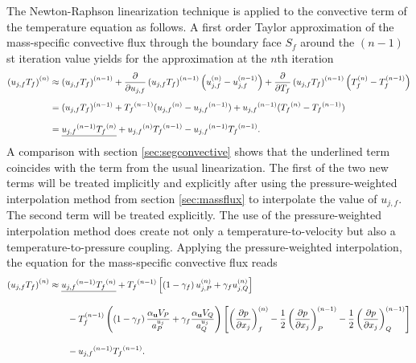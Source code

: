 The Newton-Raphson linearization technique is applied to the convective term of the temperature equation as follows. A first order Taylor approximation of the mass-specific convective flux through the boundary face \(S_f\) around the \((n-1)\)st iteration value yields for the approximation at the \(n\)th iteration
\begin{align*}
  \left(u_{j,f} T_f \right)^{(n)} 
  &\approx 
  \left(u_{j,f} T_f \right)^{(n-1)} 
  + \frac{\partial}{\partial u_{j,f}}\left( u_{j,f} T_f \right)^{(n-1)} \left(u_{j,f}^{(n)} - u_{j,f}^{(n-1)} \right) 
  + \frac{\partial}{\partial T_f}\left( u_{j,f} T_f \right)^{(n-1)} \left( T_f^{(n)} - T_f^{(n-1)} \right) \\[0.5em]
  &=
  (u_{j,f} T_f )^{(n-1)} 
  + \vphantom{(u_{j,f} T_f)}{T_f}^{(n-1)} (\vphantom{(u_{j,f} T_f)}{u_{j,f}}^{(n)} - \vphantom{(u_{j,f} T_f)}{u_{j,f}}^{(n-1)} ) 
  +  \vphantom{(u_j T)}{u_{j,f}}^{(n-1)} ( \vphantom{(u_j T)}{T_f}^{(n)} - \vphantom{(u_j T)}{T_f}^{(n-1)} ) \\[0.7em]
  &=
  \underline{\vphantom{(u_j T)}{u_{j,f}}^{(n-1)} \vphantom{(u_{j,f})}{T_f}^{(n)}}  + \vphantom{(u_{j,f} T_f)}{u_{j,f}}^{(n)} \vphantom{(u_jT)}{T_f}^{(n-1)}  -  \vphantom{(u_j T)}{u_{j,f}}^{(n-1)} \vphantom{(u_j T)}{T_f}^{(n-1)}.
\end{align*}
A comparison with section \ref{sec:segconvective} shows that the underlined term coincides with the term from the usual linearization. The first of the two new terms will be treated implicitly and explicitly after using the pressure-weighted interpolation method from section \ref{sec:massflux} to interpolate the value of \(u_{j,f}\). The second term will be treated explicitly. The use of the pressure-weighted interpolation method does create not only a temperature-to-velocity but also a temperature-to-pressure coupling. Applying the pressure-weighted interpolation, the equation for the mass-specific convective flux reads
\begin{align*}
  \left(u_{j,f} T_f \right)^{(n)} 
  &\approx 
  \underline{\vphantom{(u_j T)}{u_{j,f}}^{(n-1)} \vphantom{(u_{j,f})}{T_f}^{(n)}} + \vphantom{(u_jT)}{T_f}^{(n-1)}  \left[\left(1 - \gamma_f\right) u_{j,P}^{(n)} + \gamma_f u_{j,Q}^{(n)} \right] \nonumber\\[1em]
    &\quad\quad 
    - T_f^{(n-1)}\left(\left(1 - \gamma_f\right) \frac{\alpha_\vec{u} V_P}{a_P^{u_j}} + \gamma_f \frac{\alpha_\vec{u} V_Q}{a_Q^{u_j}}\right)
    \left[ 
    \left(\frac{\partial p}{\partial x_j}\right)_f^{(n)} 
    -  \frac{1}{2} \left( \frac{\partial p}{\partial x_j} \right)_P^{(n-1)} 
    - \frac{1}{2} \left(\frac{\partial p}{\partial x_j}\right)_Q^{(n-1)} 
    \right] \nonumber \\[1em]
    &  \quad\quad -\vphantom{(u_j T)}{u_{j,f}}^{(n-1)} \vphantom{(u_j T)}{T_f}^{(n-1)}.
\end{align*}
